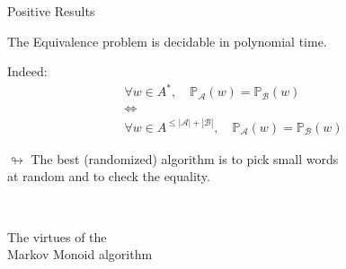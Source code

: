 \documentclass[svgnames]{beamer}
\newcommand{\A}{\mathcal{A}}
\newcommand{\B}{\mathcal{B}}
\newcommand{\prob}[1]{\mathbb{P}_{#1}}
\newcommand{\val}[1]{\text{val}(#1)}
\begin{document}
\begin{frame}{Positive Results}
\begin{theorem}
The Equivalence problem is decidable in polynomial time.
\end{theorem}
Indeed:
$$\begin{array}{c}
\forall w \in A^*,\quad \prob{\A}(w) = \prob{\B}(w) \\[.6em]
\Longleftrightarrow \\[.6em]
\forall w \in A^{\le |\A| + |\B|},\quad \prob{\A}(w) = \prob{\B}(w)
\end{array}$$
\pause

\begin{center}
$\looparrowright$
The best (randomized) algorithm is to pick small words\\
at random and to check the equality.
\end{center}
\end{frame}


\begin{frame}{\ }
\begin{center}
\begin{Huge}
The virtues of the\\[1em]
Markov Monoid algorithm
\end{Huge}
\end{center}
\end{frame}
\end{document}

